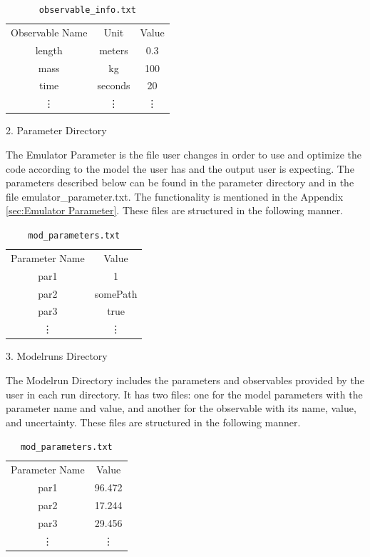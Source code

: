 \documentclass[12pt]{article}
\numberwithin{equation}{section}
\numberwithin{figure}{section}
\begin{document}
\begin{table}[!h]
    \centering
    \begin{tabular}{c|c|c}
         Observable Name & Unit & Value\\
         length & meters & 0.3 \\
         mass & kg & 100 \\
         time & seconds & 20 \\
          \vdots & \vdots & \vdots 
    \end{tabular}
    \caption{{\tt{observable\_info.txt}}}
    \label{tab:my_label}
\end{table}

2. Parameter Directory 

The Emulator Parameter is the file user changes in order to use and optimize the code according to the model the user has and the output user is expecting. The parameters described below can be found in the parameter directory and in the file emulator\_parameter.txt. The functionality is mentioned in the Appendix \ref{sec:Emulator Parameter}. These files are structured in the following manner.

\begin{table}[!h]
    \centering
    \begin{tabular}{c|c}
         Parameter Name & Value \\
         par1 & 1 \\
         par2 & somePath \\
         par3 & true \\
          \vdots & \vdots 
    \end{tabular}
    \caption{{\tt{mod\_parameters.txt}}}
    \label{tab:my_label}
\end{table}

\newpage

3. Modelruns Directory

The Modelrun Directory includes the parameters and observables provided by the user in each run directory. It has two files: one for the model parameters with the parameter name and value, and another for the observable with its name, value, and uncertainty. These files are structured in the following manner.

\begin{table}[!h]
    \centering
    \begin{tabular}{c|c}
         Parameter Name & Value \\
         par1 & 96.472 \\
         par2 & 17.244 \\
         par3 & 29.456 \\
          \vdots & \vdots 
    \end{tabular}
    \caption{{\tt{mod\_parameters.txt}}}
    \label{tab:my_label}
\end{table}
\end{document}
